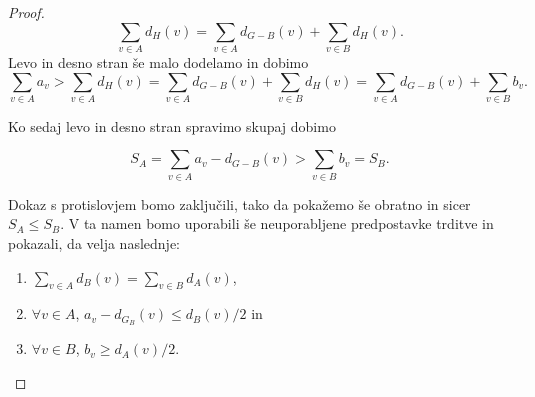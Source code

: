 \documentclass[12pt,a4paper,twoside]{article}
\theoremstyle{definition} %
\theoremstyle{plain} %
\numberwithin{equation}{section}  %
\begin{document}
\begin{proof}
$$\sum_{v \in A} d_H(v) = \sum_{v \in A} d_{G-B}(v) + \sum_{v \in B} d_H(v). $$
Levo in desno stran še malo dodelamo in dobimo
$$ \sum_{v\in A}a_v > \sum_{v \in A} d_H(v) = \sum_{v \in A} d_{G-B}(v) + \sum_{v \in B} d_H(v) =\sum_{v \in A} d_{G-B}(v) + \sum_{v \in B} b_v . $$

Ko sedaj levo in desno stran spravimo skupaj dobimo

 $$ S_A = \sum_{v\in A}a_v - d_{G-B}(v) > \sum_{v \in B} b_v = S_B.$$

Dokaz s protislovjem bomo zaključili, tako da pokažemo še obratno in sicer $S_A \le S_B$. V ta namen bomo uporabili še neuporabljene predpostavke trditve in pokazali, da velja naslednje:

\begin{enumerate}
\item $\sum_ {v\in A}d_B(v) = \sum_{v \in B}d_A(v)$,
\item $\forall v \in A$,  $a_v - d_{G_B}(v) \le d_B(v)/2$ in
\item  $\forall v \in B$,  $b_v \ge d_A(v)/2.$


\end{enumerate}
\end{proof}
\end{document}
